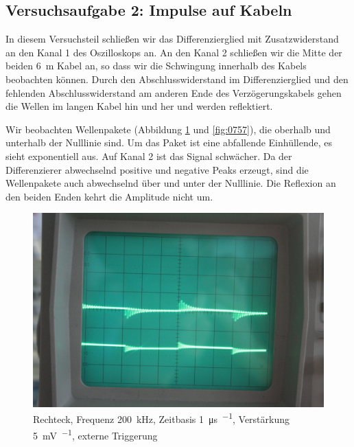 \FloatBarrier
\subsection{Versuchsaufgabe 2: Impulse auf Kabeln}

In diesem Versuchsteil schließen wir das Differenzierglied mit Zusatzwiderstand
an den Kanal 1 des Oszilloskops an. An den Kanal 2 schließen wir die Mitte der
beiden \SI{6}{\meter} Kabel an, so dass wir die Schwingung innerhalb des Kabels
beobachten können. Durch den Abschlusswiderstand im Differenzierglied und den
fehlenden Abschlusswiderstand am anderen Ende des Verzögerungskabels gehen die
Wellen im langen Kabel hin und her und werden reflektiert.

Wir beobachten Wellenpakete (Abbildung \ref{fig:0756} und \ref{fig:0757}), die
oberhalb und unterhalb der Nulllinie sind. Um das Paket ist eine abfallende
Einhüllende, es sieht exponentiell aus. Auf Kanal 2 ist das Signal schwächer.
Da der Differenzierer abwechselnd positive und negative Peaks erzeugt, sind die
Wellenpakete auch abwechselnd über und unter der Nulllinie. Die Reflexion an
den beiden Enden kehrt die Amplitude nicht um.

\begin{figure}
	\centering
	\begin{minipage}{.45\linewidth}
	\end{minipage}
	\hfill
	\begin{minipage}{.45\linewidth}
	\includegraphics[width=\linewidth]{Fotos/IMG_0756-1500.jpg}
	\end{minipage}
	\caption{%
		Rechteck, Frequenz \SI{200}{\kilo\hertz}, Zeitbasis \SI{1}{\micro\second\per\division}, Verstärkung \SI{5}{\milli\volt\per\division}, externe Triggerung
	}
	\label{fig:0756}
\end{figure}

